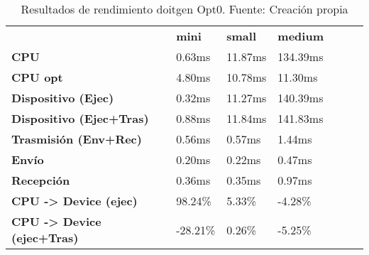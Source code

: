 \begin{table}[H]
    \centering
    \begin{tabular}{lllllll}
    \rowcolor[HTML]{DAE8FC} \ &  \textbf{mini} &  \textbf{	small} &  \textbf{	medium} \\
    \cellcolor[HTML]{DAE8FC} \textbf{CPU} & 0.63ms & 	11.87ms & 	134.39ms \\
    \rowcolor[HTML]{EFEFEF} \cellcolor[HTML]{DAE8FC} \textbf{CPU opt} & 4.80ms & 	10.78ms & 	11.30ms \\
    \cellcolor[HTML]{DAE8FC} \textbf{Dispositivo (Ejec)} & 0.32ms & 	11.27ms & 	140.39ms \\
    \rowcolor[HTML]{EFEFEF} \cellcolor[HTML]{DAE8FC} \textbf{Dispositivo (Ejec+Tras)} & 0.88ms & 	11.84ms & 	141.83ms \\
    \cellcolor[HTML]{DAE8FC} \textbf{Trasmisión (Env+Rec)} & 0.56ms & 	0.57ms & 	1.44ms \\
    \rowcolor[HTML]{EFEFEF} \cellcolor[HTML]{DAE8FC} \textbf{Envío} & 0.20ms & 	0.22ms & 	0.47ms \\
    \cellcolor[HTML]{DAE8FC} \textbf{Recepción} & 0.36ms & 	0.35ms & 	0.97ms \\
    \rowcolor[HTML]{EFEFEF} \cellcolor[HTML]{DAE8FC} \textbf{CPU -> Device (ejec)} & 98.24\% & 	5.33\% & 	-4.28\% \\
    \cellcolor[HTML]{DAE8FC} \textbf{CPU -> Device (ejec+Tras)} & -28.21\% & 	0.26\% & 	-5.25\% \\
    \end{tabular}
    \caption[Resultados de rendimiento doitgen Opt0]{{Resultados de rendimiento doitgen Opt0. Fuente: Creación propia}}
    \label{table_test_doitgen_Opt0_hw_performanceResults}
\end{table}